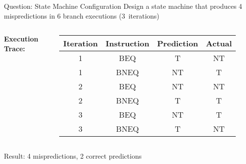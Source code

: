 \documentclass[aspectratio=169,12pt]{beamer}
\begin{document}
\begin{frame}{Question: State Machine Configuration}
\textbf{} Design a state machine that produces 4 mispredictions in 6 branch executions (3~iterations)

\pause
\begin{center}
\end{center}
\begin{columns}
\textbf{Execution Trace:}
\begin{table}
\centering
\scriptsize
\begin{tabular}{|c|c|c|c|}
\hline
\textbf{Iteration} & \textbf{Instruction} & \textbf{Prediction} & \textbf{Actual} \\
\hline
1 & BEQ & T & NT \\
1 & BNEQ & NT & T \\
2 & BEQ & NT & NT \\
2 & BNEQ & T & T \\
3 & BEQ & NT & T \\
3 & BNEQ & T & NT \\
\hline
\end{tabular}
\end{table}
\end{columns}

Result: 4 mispredictions, 2 correct predictions
\end{frame}
\end{document}
